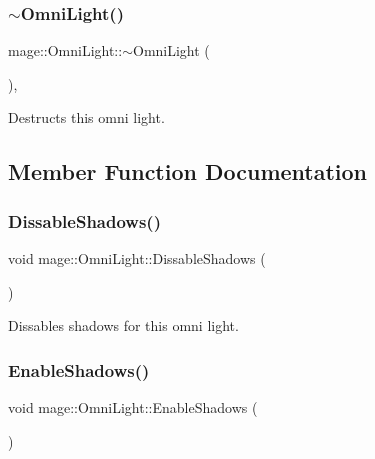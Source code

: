 \subsubsection{\texorpdfstring{$\sim$\+Omni\+Light()}{~OmniLight()}}
{\footnotesize\ttfamily mage\+::\+Omni\+Light\+::$\sim$\+Omni\+Light (\begin{DoxyParamCaption}{ }\end{DoxyParamCaption})\hspace{0.3cm}{\ttfamily [virtual]}, {\ttfamily [default]}}

Destructs this omni light. 

\subsection{Member Function Documentation}
\hypertarget{classmage_1_1_omni_light_a2353a53e336ffb55be9949ea6f1d8979}{}\label{classmage_1_1_omni_light_a2353a53e336ffb55be9949ea6f1d8979} 
\subsubsection{\texorpdfstring{Dissable\+Shadows()}{DissableShadows()}}
{\footnotesize\ttfamily void mage\+::\+Omni\+Light\+::\+Dissable\+Shadows (\begin{DoxyParamCaption}{ }\end{DoxyParamCaption})\hspace{0.3cm}{\ttfamily [noexcept]}}

Dissables shadows for this omni light. \hypertarget{classmage_1_1_omni_light_ad7c2e780dc83eb63fa44e1475492e192}{}\label{classmage_1_1_omni_light_ad7c2e780dc83eb63fa44e1475492e192} 
\subsubsection{\texorpdfstring{Enable\+Shadows()}{EnableShadows()}}
{\footnotesize\ttfamily void mage\+::\+Omni\+Light\+::\+Enable\+Shadows (\begin{DoxyParamCaption}{ }\end{DoxyParamCaption})\hspace{0.3cm}{\ttfamily [noexcept]}}

